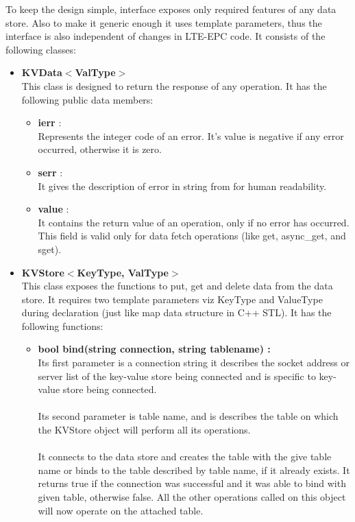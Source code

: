 \documentclass[11pt]{article}
\begin{document}
To keep the design simple, interface exposes only required features of any data store. Also to make it generic enough it uses template parameters, thus the interface is also independent of changes in LTE-EPC code. It consists of the following classes:

\begin{itemize}
\item \textbf{KVData$<$ValType$>$}\\
This class is designed to return the response of any operation. It has the following public data members:
\begin{itemize}
\item \textbf{ierr} :\\
Represents the integer code of an error. It's value is negative if any error occurred, otherwise it is zero.
\item \textbf{serr} :\\
It gives the description of error in string from for human readability.
\item \textbf{value} :\\
It contains the return value of an operation, only if no error has occurred. This field is valid only for data fetch operations (like get, async\_get, and sget).
\end{itemize}

\item \textbf{KVStore$<$KeyType, ValType$>$}\\
This class exposes the functions to put, get and delete data from the data store. It requires two template parameters viz KeyType and ValueType during declaration (just like map data structure in C++ STL).
It has the following functions:
\begin{itemize}
\item \textbf{bool bind(string connection, string tablename) :} \\
Its first parameter is a connection string it describes the socket address or server list of the key-value store being connected and is specific to key-value store being connected. 
\\\\Its second parameter is table name, and is describes the table on which the KVStore object will perform all its operations. 
\\\\It connects to the data store and creates the table with the give table name or binds to the table described by table name, if it already exists. It returns true if the connection was successful and it was able to bind with given table, otherwise false. All the other operations called on this object will now operate on the attached table.\\


\end{itemize}
\end{itemize}
\end{document}
